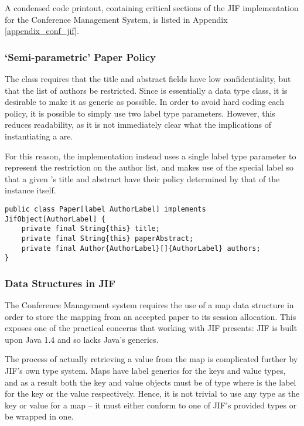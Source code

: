 A condensed code printout, containing critical sections of the JIF implementation for the Conference Management System, is listed in Appendix \ref{appendix_conf_jif}.

\subsubsection{`Semi-parametric' Paper Policy}

The  class requires that the title and abstract fields have low confidentiality, but that the list of authors be restricted. Since  is essentially a data type class, it is desirable to make it as generic as possible. In order to avoid hard coding each policy, it is possible to simply use two label type parameters. However, this reduces readability, as it is not immediately clear what the implications of instantiating a  are.

For this reason, the implementation instead uses a single label type parameter to represent the restriction on the author list, and makes use of the special  label so that a given 's title and abstract have their policy determined by that of the instance itself.

\begin{verbatim}
public class Paper[label AuthorLabel] implements JifObject[AuthorLabel] {
	private final String{this} title;
	private final String{this} paperAbstract;
	private final Author{AuthorLabel}[]{AuthorLabel} authors;
}
\end{verbatim}

\subsubsection{Data Structures in JIF}

The Conference Management system requires the use of a map data structure in order to store the mapping from an accepted paper to its session allocation. This exposes one of the practical concerns that working with JIF presents: JIF is built upon Java 1.4 and so lacks Java's generics.

The process of actually retrieving a value from the map is complicated further by JIF's own type system. Maps have label generics for the keys and value types, and as a result both the key and value objects must be of type  where  is the label for the key or the value respectively. Hence, it is not trivial to use any type as the key or value for a map -- it must either conform to one of JIF's provided types or be wrapped in one.

